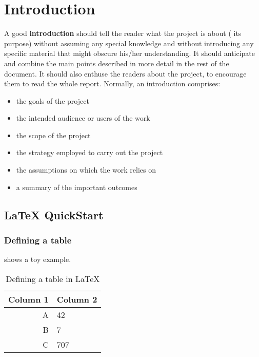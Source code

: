 
\chapter{Introduction}\label{ch:introduction}


A good \textbf{introduction} should tell the reader what the project is about (\ie{} its purpose) without assuming any special knowledge and without introducing any specific material that might obscure his/her understanding. It should anticipate and combine the main points described in more detail in the rest of the document. It should also enthuse the readers about the project, to encourage them to read the whole report. Normally, an introduction comprises:

\begin{itemize}
	\item the goals of the project
	\item the intended audience or users of the work
	\item the scope of the project
	\item the strategy employed to carry out the project
	\item the assumptions on which the work relies on
	\item a summary of the important outcomes
\end{itemize}

\section{\LaTeX{} QuickStart}

\subsection{Defining a table}

 shows a toy example.

\begin{table}
  \centering 
  \caption{Defining a table in \LaTeX{}}\label{tb:example} 
  \begin{tabular}{rl}    
	\toprule
	\textbf{Column 1} & \textbf{Column 2} \\ 
	\midrule
	   A & 42\\
	   B & 7\\
	   C & 707\\
	\bottomrule
  \end{tabular}
\end{table}


